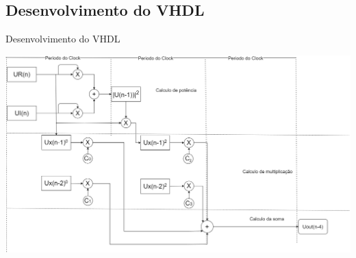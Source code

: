 \documentclass{if-beamer}
\begin{document}
\subsection{Desenvolvimento do VHDL}
\begin{frame}{Desenvolvimento do VHDL}
	
		\includegraphics[scale=0.2]{diagrama_process.png}
\end{frame}
\end{document}
